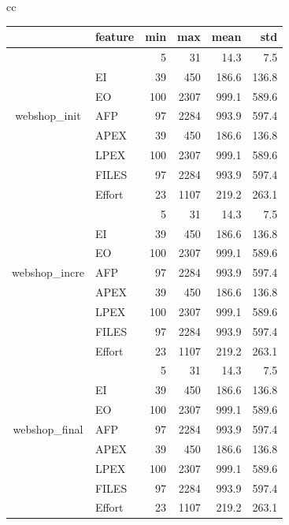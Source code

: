 \documentclass[sigconf,review,anonymous]{acmart}
\begin{document}
\begin{table}[t!]
{\begin{tabular}{cc}
\scriptsize
\begin{tabular}{|c|l|rrrr|}
    \hline
      & feature
    & min  & max & mean & std\\
  \hline
\multirow{7}{*}{\begin{sideways}webshop\_init\end{sideways}}
& \IT{LOC} & 5 & 31 & 14.3 & 7.5\\
& EI & 39 & 450 & 186.6 & 136.8\\
& EO & 100 & 2307 & 999.1 & 589.6\\
& AFP & 97 & 2284 & 993.9 & 597.4\\
& APEX & 39 & 450 & 186.6 & 136.8\\
& LPEX & 100 & 2307 & 999.1 & 589.6\\
& FILES & 97 & 2284 & 993.9 & 597.4\\
& Effort & 23 & 1107 & 219.2 & 263.1\\
\hline
\multirow{7}{*}{\begin{sideways}webshop\_incre\end{sideways}}
& \IT{LOC} & 5 & 31 & 14.3 & 7.5\\
& EI & 39 & 450 & 186.6 & 136.8\\
& EO & 100 & 2307 & 999.1 & 589.6\\
& AFP & 97 & 2284 & 993.9 & 597.4\\
& APEX & 39 & 450 & 186.6 & 136.8\\
& LPEX & 100 & 2307 & 999.1 & 589.6\\
& FILES & 97 & 2284 & 993.9 & 597.4\\
& Effort & 23 & 1107 & 219.2 & 263.1\\
\hline
\multirow{7}{*}{\begin{sideways}webshop\_final\end{sideways}}
& \IT{LOC} & 5 & 31 & 14.3 & 7.5\\
& EI & 39 & 450 & 186.6 & 136.8\\
& EO & 100 & 2307 & 999.1 & 589.6\\
& AFP & 97 & 2284 & 993.9 & 597.4\\
& APEX & 39 & 450 & 186.6 & 136.8\\
& LPEX & 100 & 2307 & 999.1 & 589.6\\
& FILES & 97 & 2284 & 993.9 & 597.4\\
& Effort & 23 & 1107 & 219.2 & 263.1\\
\hline
\end{tabular} 
\end{tabular}
}
\end{table}
\end{document}
